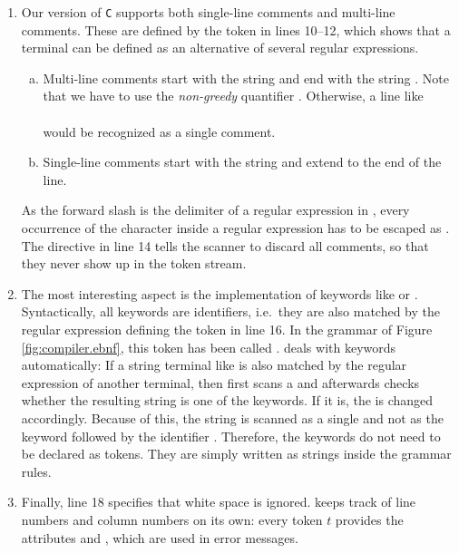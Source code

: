 \begin{enumerate}
      The operators that consist of a single character need no declaration at all:   gives
      the corresponding anonymous terminals names like , , or .
\item Our version of \texttt{C} supports both single-line comments and multi-line comments.  These are
      defined by the token  in lines 10--12, which shows that a terminal can be defined as an
      alternative of several regular expressions.
      \begin{enumerate}[(a)]
      \item Multi-line comments start with the string \quoted{/*} and end with the string \quoted{*/}.
            Note that we have to use the \emph{non-greedy} quantifier .  Otherwise, a line like
            \\[0.2cm]
            \hspace*{1.3cm}
            \\[0.2cm]
            would be recognized as a single comment.
      \item Single-line comments start with the string \quoted{//} and extend to the end of the line.
      \end{enumerate}
      As the forward slash is the delimiter of a regular expression in , every occurrence of
      the character \quoted{/} inside a regular expression has to be escaped as .
      The directive  in line 14 tells the scanner to discard all comments, so that they never
      show up in the token stream.
\item The most interesting aspect is the implementation of keywords like  or .
      Syntactically, all keywords are identifiers, i.e.~they are also matched by the regular expression defining
      the token  in line 16.  In the grammar of Figure \ref{fig:compiler.ebnf}, this token has been
      called .   deals with keywords automatically:  If a string terminal
      like  is also matched by the regular expression of another terminal, then 
      first scans a  and afterwards checks whether the resulting string is one of the keywords.  If
      it is, the  is changed accordingly.  Because of this, the string
       is scanned as a single  and not as the keyword  followed by the
      identifier .  Therefore, the keywords do not need to be declared as tokens.  They are simply
      written as strings inside the grammar rules.
\item Finally, line 18 specifies that white space is ignored.   keeps track of line numbers
      and column numbers on its own:  every token $t$ provides the attributes  and ,
      which are used in error messages.
\end{enumerate}

